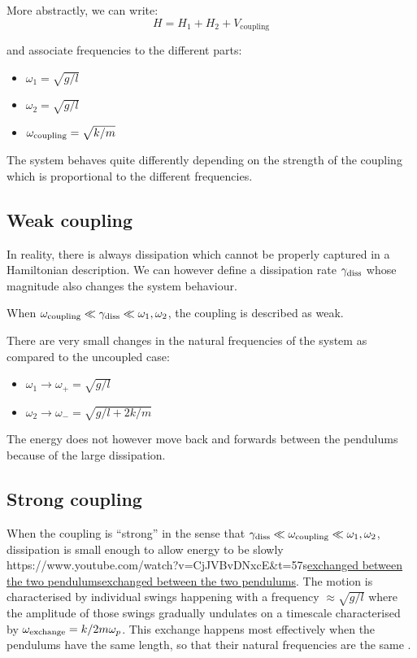 \documentclass[
]{article}
\let\oldhref\href
\renewcommand{\href}[2]{\ifx#1\urlprefix\oldhref{#1}{#2}\else\uline{\oldhref{#1}{#2}}\fi}
\renewcommand{\[}{\begin{equation}}
\renewcommand{\]}{\end{equation}}
\providecommand{\tightlist}{%
  \setlength{\itemsep}{0pt}\setlength{\parskip}{0pt}}
\begin{document}
More abstractly, we can write: \[
H = H_1 + H_2+ V_{\text{coupling}}
\]

and associate frequencies to the different parts:

\begin{itemize}
\tightlist
\item
  \(\omega_1 = \sqrt{g/l}\)
\item
  \(\omega_2 = \sqrt{g/l}\)
\item
  \(\omega_{\rm coupling} = \sqrt{k/m}\)
\end{itemize}

The system behaves quite differently depending on the strength of the
coupling which is proportional to the different frequencies.

\subsection{Weak coupling}\label{weak-coupling}

In reality, there is always dissipation which cannot be properly
captured in a Hamiltonian description. We can however define a
dissipation rate \(\gamma_{\rm diss}\) whose magnitude also changes the
system behaviour.

When
\(\omega_{\rm coupling} \ll \gamma_{\rm diss} \ll \omega_1,\omega_2\),
the coupling is described as weak.

There are very small changes in the natural frequencies of the system as
compared to the uncoupled case:

\begin{itemize}
\tightlist
\item
  \(\omega_1 \rightarrow \omega_+ = \sqrt{g/l}\)
\item
  \(\omega_2 \rightarrow \omega_- = \sqrt{g/l + 2k/m}\)
\end{itemize}

The energy does not however move back and forwards between the pendulums
because of the large dissipation.

\subsection{Strong coupling}\label{strong-coupling}

When the coupling is ``strong'' in the sense that
\(\gamma_{\rm diss} \ll \omega_{\rm coupling} \ll \omega_1,\omega_2\),
dissipation is small enough to allow energy to be slowly
\href{https://www.youtube.com/watch?v=CjJVBvDNxcE&t=57s}{exchanged
between the two pendulums}. The motion is characterised by individual
swings happening with a frequency \(\approx \sqrt{g/l}\) where the
amplitude of those swings gradually undulates on a timescale
characterised by \(\omega_{\rm exchange} = k/2m\omega_p\). This exchange
happens most effectively when the pendulums have the same length, so
that their natural frequencies are the same .
\end{document}
